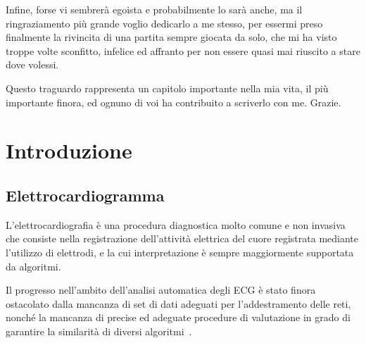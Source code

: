 \documentclass[12pt,italian]{report}
\newcommand\blankpage{
    \null
    \thispagestyle{empty}
    \addtocounter{page}{-1}
    \newpage}
\begin{document}
Infine, forse vi sembrerà egoista e probabilmente lo sarà anche, ma il ringraziamento più grande voglio dedicarlo a me stesso, per essermi preso finalmente la rivincita di una partita sempre giocata da solo, che mi ha visto troppe volte sconfitto, infelice ed affranto per non essere quasi mai riuscito a stare dove volessi.

Questo traguardo rappresenta un capitolo importante nella mia vita, il più importante finora, ed ognuno di voi ha contribuito a scriverlo con me. Grazie.

\afterpage{\blankpage}

\afterpreface
\afterpage{\blankpage}

\chapter{Introduzione}
\label{chap:introduzione}

\section{Elettrocardiogramma}
\label{sec:elettrocardiogramma}

L'elettrocardiografia è una procedura diagnostica molto comune e non invasiva che consiste nella registrazione dell'attività elettrica del cuore registrata mediante l'utilizzo di elettrodi, e la cui interpretazione è sempre maggiormente supportata da algoritmi.

Il progresso nell'ambito dell'analisi automatica degli ECG è stato finora ostacolato dalla mancanza di set di dati adeguati per l'addestramento delle reti, nonché la mancanza di precise ed adeguate procedure di valutazione in grado di garantire la similarità di diversi algoritmi~\cite{deeplearning}.
\end{document}
